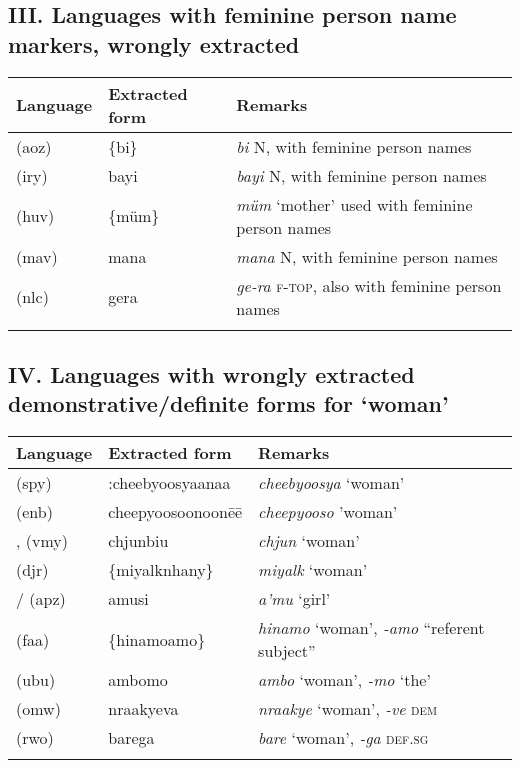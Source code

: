 \subsection*{III. Languages with feminine person name markers, wrongly extracted \normalfont [6 languages]}

\begin{tabularx}{\textwidth}{llQ}
\lsptoprule
 Language &  Extracted form &  Remarks \\
\midrule
{} (aoz)	&	\{bi\}	&	\textit{bi} N, with feminine person names	\\
 (iry)	&	bayi	&	\textit{bayi} N, with feminine person names	\\
 (huv)	&	\{müm\}	&	\textit{müm} ‘mother’ used with feminine person names 	\\
 (mav)	&	mana	&	\textit{mana} N, with feminine person names	\\
 (nlc)	&	gera	&	\textit{ge-ra} \textsc{f-top}, also with feminine person names	\\
\lspbottomrule
\end{tabularx}



\subsection*{IV. Languages with wrongly extracted demonstrative/definite forms for ‘woman’
\normalfont [9 languages]}

\begin{tabularx}{\textwidth}{llQ}
\lsptoprule
 Language &  Extracted form &  Remarks \\
\midrule
{} (spy)	&	:cheebyoosyaanaa	&	\textit{cheebyoosya} ‘woman’	\\
 (enb)	&	cheepyoosoonoonēē	&	\textit{cheepyooso} ’woman’	\\
,  (vmy)	&	chjunbiu	&	\textit{chjun} ‘woman’	\\
 (djr)	&	\{miyalknhany\}	&	\textit{miyalk} ‘woman’	\\
/ (apz)	&	a\textquotesingle{}musi	&	\textit{a'mu} ‘girl’	\\
 (faa)	&	\{hinamoamo\}	&	\textit{hinamo} ‘woman’, \textit{-amo} “referent subject”	\\
 (ubu)	&	ambomo	&	\textit{ambo} ‘woman’, \textit{-mo} ‘the’	\\
 (omw)	&	nraakyeva	&	\textit{nraakye} ‘woman’, \textit{-ve} \textsc{dem}	\\
 (rwo)	&	barega	&	\textit{bare} ‘woman’, \textit{-ga} \textsc{def.sg}	\\
\lspbottomrule
\end{tabularx}


